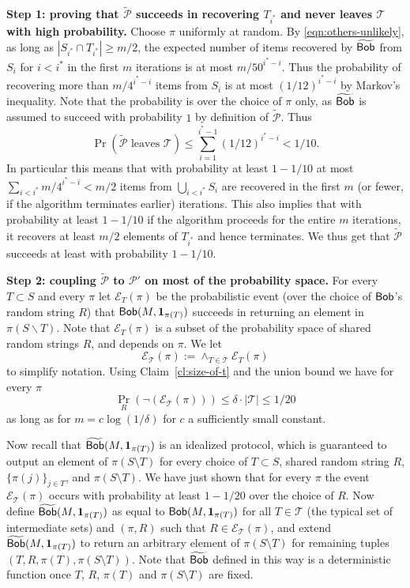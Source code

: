 {\bf Step 1: proving that $\widetilde{\mathcal{P}}$ succeeds in recovering $T_{i^*}$ and never leaves $\mathcal{T}$ with high probability.}
Choose $\pi$ uniformly at random. By \eqref{eqn:others-unlikely}, as long as $|S_{i^*}\cap T_{i^*}|\geq m/2$, the expected number of items recovered by $\widetilde{\mathsf{Bob}}$ from $S_i$ for $i<i^*$ in the first $m$ iterations is at most $m/50^{i^*-i}$. Thus the probability of recovering more than $m/4^{i^*-i}$ items from $S_i$ is at most $(1/12)^{i^*-i}$ by Markov's inequality. Note that the probability is over the choice of $\pi$ only, as $\widetilde{\mathsf{Bob}}$ is assumed to succeed with probability $1$ by definition of $\widetilde{\mathcal{P}}$. 
Thus
$$
\Pr( \widetilde{\mathcal{P}}\text{~leaves~}\mathcal{T}) \le \sum_{i=1}^{i^*-1}\left(1/12\right)^{i^*-i} < 1/10.
$$
In particular this means that with probability at least $1-1/10$ at most $\sum_{i<i^*} m/4^{i^*-i}<m/2$ items from $\bigcup_{i<i^*} S_i$ are recovered in the first $m$ (or fewer, if the algorithm terminates earlier) iterations. This also implies that with probability at least $1-1/10$ if the algorithm proceeds for the entire $m$ iterations, it recovers at least $m/2$ elements of $T_{i^*}$ and hence terminates. We thus get that $\widetilde{\mathcal{P}}$ succeeds at least with probability $1-1/10$.

{\bf Step 2: coupling $\widetilde{\mathcal{P}}$ to $\mathcal{P}'$ on most of the probability space.}
For every $T\subset S$ and every $\pi$ let $\mathcal{E}_T(\pi)$ be the probabilistic event (over the choice of $\mathsf{Bob}$'s random string $R$) that $\mathsf{Bob}(M, \mathbf{1}_{\pi(T)})$ succeeds in returning an element in $\pi(S\backslash T)$. Note that $\mathcal{E}_T(\pi)$ is a subset of the probability space of shared random strings $R$, and depends on $\pi$. We let 
$$
\mathcal{E}_{\mathcal T}(\pi):=\wedge_{T\in\mathcal T} \mathcal E_T(\pi)
$$
to simplify notation. Using Claim~\ref{cl:size-of-t} and the union bound we have for every $\pi$
$$
\Pr_R(\neg(\mathcal E_{\mathcal T}(\pi))) \le \delta\cdot |\mathcal T|\leq 1/20
$$
as long as for $m = c\log(1/\delta)$ for $c$ a sufficiently small constant.

Now recall that $\widetilde{\mathsf{Bob}}(M, \mathbf{1}_{\pi(T)})$ is an idealized protocol, which is guaranteed to output an element of $\pi(S\setminus T)$ for every choice of  $T\subset S$, shared random string $R$, $\{\pi(j)\}_{j\in T}$, and $\pi(S\setminus T)$. We have just shown that for every $\pi$ the event ${\mathcal E_{\mathcal T}(\pi)}$ occurs  with probability at least $1-1/20$ over the choice of $R$. Now define $\widetilde{\mathsf{Bob}}(M, \mathbf{1}_{\pi(T)})$ as equal to $\mathsf{Bob}(M, \mathbf{1}_{\pi(T)})$ for all $T\in \mathcal{T}$ (the typical set of intermediate sets) and $(\pi, R)$ such that $R\in {\mathcal E_{\mathcal T}(\pi)}$, and extend $\widetilde{\mathsf{Bob}}(M, \mathbf{1}_{\pi(T)})$ to return an arbitrary element of $\pi(S\setminus T)$ for remaining tuples $(T, R, \pi(T),  \pi(S\setminus T))$. Note that $\widetilde{\mathsf{Bob}}$ defined in this way is a deterministic function once $T$, $R$, $\pi(T)$ and $\pi(S\setminus T)$ are fixed. 

